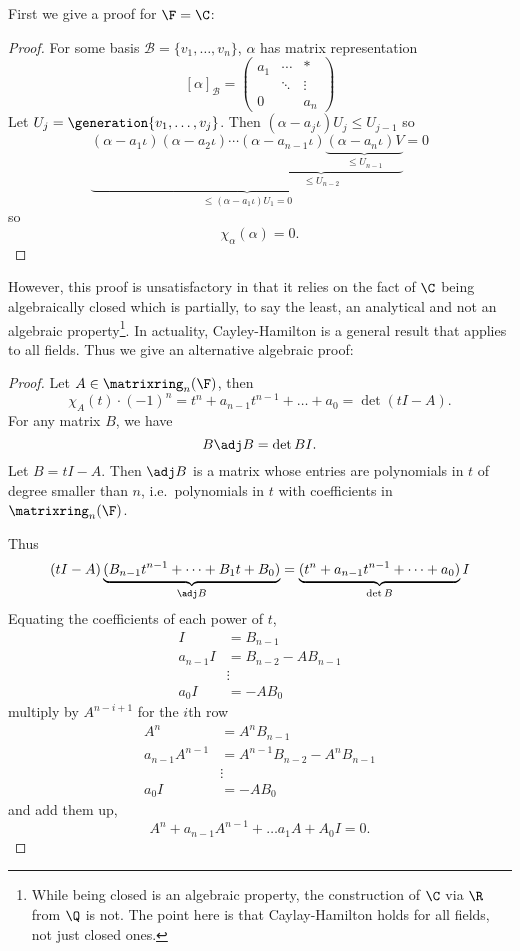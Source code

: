 \documentclass[a4paper]{article}
\newcommand*{\M}{\matrixring}
\newcommand*{\spans}{\generation}
\newcommand*{\basis}{\mathcal}
\theoremstyle{definition}
\begin{document}
First we give a proof for \(\F = \C\):

\begin{proof}
  For some basis \(\basis B = \{v_1, \dots, v_n\}\), \(\alpha\) has matrix representation
  \[
    [\alpha]_{\basis B} =
    \begin{pmatrix}
      a_1 & \cdots & * \\
      & \ddots & \vdots \\
      0 & & a_n
    \end{pmatrix}
  \]
  Let \(U_j = \spans{v_1, \dots, v_j}\). Then \((\alpha - a_j \iota) U_j \leq U_{j - 1}\) so
  \[
    \underbrace{(\alpha - a_1 \iota) (\alpha - a_2 \iota) \cdots \underbrace{(\alpha - a_{n - 1} \iota) \underbrace{(\alpha - a_n \iota) V}_{\leq U_{n - 1}}}_{\leq U_{n - 2}}}_{\leq (\alpha - a_1\iota) U_1 = 0} = 0
  \]
  so
  \[
    \chi_\alpha(\alpha) = 0.
  \]
\end{proof}

However, this proof is unsatisfactory in that it relies on the fact of \(\C\) being algebraically closed which is partially, to say the least, an analytical and not an algebraic property\footnote{While being closed is an algebraic property, the construction of \(\C\) via \(\R\) from \(\Q\) is not. The point here is that Caylay-Hamilton holds for all fields, not just closed ones.}. In actuality, Cayley-Hamilton is a general result that applies to all fields. Thus we give an alternative algebraic proof:

\begin{proof}
  Let \(A \in \M_n(\F)\), then
  \[
    \chi_A(t) \cdot (-1)^n = t^n + a_{n - 1}t^{n - 1} + \dots + a_0 = \det(tI - A).
  \]
  For any matrix \(B\), we have
  \[
    B \adj B = \det B I.
  \]
  Let \(B = tI - A\). Then \(\adj B\) is a matrix whose entries are polynomials in \(t\) of degree smaller than \(n\), i.e.\ polynomials in \(t\) with coefficients in \(\M_n(\F)\).

  Thus
  \[
    (tI - A) \underbrace{(B_{n - 1}t^{n - 1} + \cdots + B_1 t + B_0)}_{\adj B} = \underbrace{(t^n + a_{n - 1}t^{n - 1} + \cdots + a_0)}_{\det B} I
  \]
  Equating the coefficients of each power of \(t\),
  \begin{align*}
    I &= B_{n - 1} \\
    a_{n - 1} I &= B_{n - 2} - AB_{n - 1} \\
    & \vdots \\
    a_0 I &= -AB_0
  \end{align*}
  multiply by \(A^{n - i + 1}\) for the \(i\)th row
  \begin{align*}
    A^n &= A^n B_{n - 1} \\
    a_{n - 1} A^{n - 1} &= A^{n - 1} B_{n - 2} - A^n B_{n - 1} \\
    & \vdots \\
    a_0 I &= -AB_0
  \end{align*}
  and add them up,
  \[
    A^n + a_{n - 1}A^{n - 1} + \dots a_1 A + A_0 I = 0.
  \]
\end{proof}
\end{document}
